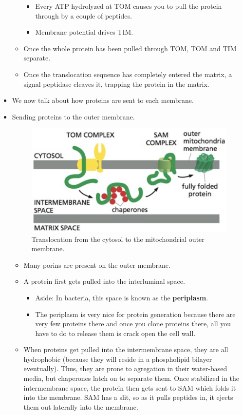 \documentclass[../notes.tex]{subfiles}
\begin{document}
\begin{itemize}
\begin{itemize}
        \begin{itemize}
            \item Every ATP hydrolyzed at TOM causes you to pull the protein through by a couple of peptides.
            \item Membrane potential drives TIM.
        \end{itemize}
        \item Once the whole protein has been pulled through TOM, TOM and TIM separate.
        \item Once the translocation sequence has completely entered the matrix, a signal peptidase cleaves it, trapping the protein in the matrix.
    \end{itemize}
    \item We now talk about how proteins are sent to each membrane.
    \item Sending proteins to the outer membrane.
    \begin{figure}[h!]
        \centering
        \includegraphics[width=0.35\linewidth]{../ExtFiles/MiTransCytOut.png}
        \caption{Translocation from the cytosol to the mitochondrial outer membrane.}
        \label{fig:MiTransCytOut}
    \end{figure}
    \begin{itemize}
        \item Many porins are present on the outer membrane.
        \item A protein first gets pulled into the interluminal space.
        \begin{itemize}
            \item Aside: In bacteria, this space is known as the \textbf{periplasm}.
            \item The periplasm is very nice for protein generation because there are very few proteins there and once you clone proteins there, all you have to do to release them is crack open the cell wall.
        \end{itemize}
        \item When proteins get pulled into the intermembrane space, they are all hydrophobic (because they will reside in a phospholipid bilayer eventually). Thus, they are prone to agregation in their water-based media, but chaperones latch on to separate them. Once stabilized in the intermembrane space, the protein then gets sent to SAM which folds it into the membrane. SAM has a slit, so as it pulls peptides in, it ejects them out laterally into the membrane.

\end{itemize}
\end{itemize}
\end{document}
